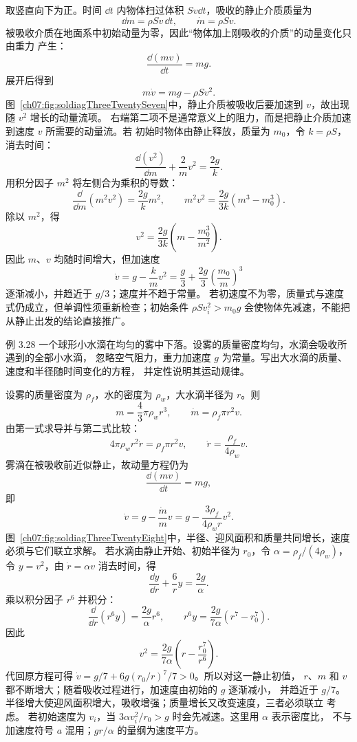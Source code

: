 \begin{xesolution}
取竖直向下为正。时间 $\dd t$ 内物体扫过体积 $Sv\dd t$，吸收的静止介质质量为
\[
 \dd m=\rho Sv\,\dd t,
 \qquad
 \boxed{\dot m=\rho Sv}.
\]
被吸收介质在地面系中初始动量为零，因此“物体加上刚吸收的介质”的动量变化只由重力
产生：
\[
 \frac{\dd(mv)}{\dd t}=mg.
\]
展开后得到
\[
 \boxed{m\dot v=mg-\rho Sv^2}.
\]
图~\ref{ch07:fig:soldiagThreeTwentySeven}中，静止介质被吸收后要加速到 $v$，故出现随 $v^2$ 增长的动量流项。
\soldiagThreeTwentySeven
右端第二项不是通常意义上的阻力，而是把静止介质加速到速度 $v$ 所需要的动量流。若
初始时物体由静止释放，质量为 $m_0$，令 $k=\rho S$，消去时间：
\[
 \frac{\dd(v^2)}{\dd m}+\frac{2}{m}v^2=\frac{2g}{k}.
\]
用积分因子 $m^2$ 将左侧合为乘积的导数：
\[
 \frac{\dd}{\dd m}(m^2v^2)=\frac{2g}{k}m^2,
 \qquad m^2v^2=\frac{2g}{3k}(m^3-m_0^3).
\]
除以 $m^2$，得
\[
 v^2=\frac{2g}{3k}
 \left(m-\frac{m_0^3}{m^2}\right).
\]
因此 $m$、$v$ 均随时间增大，但加速度
\[
 \dot v=g-\frac{k}{m}v^2=\frac g3+\frac{2g}{3}\left(\frac{m_0}{m}\right)^3
\]
逐渐减小，并趋近于 $g/3$；速度并不趋于常量。
若初速度不为零，质量式与速度式仍成立，但单调性须重新检查；初始条件
$\rho S v_i^2>m_0g$ 会使物体先减速，不能把从静止出发的结论直接推广。
\end{xesolution}

\Needspace{0.30\textheight}
\begin{origexamplebox}{例 3.28}
一个球形小水滴在均匀的雾中下落。设雾的质量密度均匀，水滴会吸收所遇到的全部小水滴，
忽略空气阻力，重力加速度 $g$ 为常量。写出大水滴的质量、速度和半径随时间变化的方程，
并定性说明其运动规律。
\end{origexamplebox}

\begin{xesolution}
设雾的质量密度为 $\rho_f$，水的密度为 $\rho_w$，大水滴半径为 $r$。则
\[
 m=\frac43\pi\rho_w r^3,
 \qquad
 \dot m=\rho_f\pi r^2v.
\]
由第一式求导并与第二式比较：
\[
 4\pi\rho_w r^2\dot r=\rho_f\pi r^2v,
 \qquad
 \boxed{\dot r=\frac{\rho_f}{4\rho_w}v}.
\]
雾滴在被吸收前近似静止，故动量方程仍为
\[
 \frac{\dd(mv)}{\dd t}=mg,
\]
即
\[
 \boxed{\dot v
 =g-\frac{\dot m}{m}v
 =g-\frac{3\rho_f}{4\rho_w r}v^2}.
\]
图~\ref{ch07:fig:soldiagThreeTwentyEight}中，半径、迎风面积和质量共同增长，速度必须与它们联立求解。
\soldiagThreeTwentyEight
若水滴由静止开始、初始半径为 $r_0$，令
$\alpha=\rho_f/(4\rho_w)$，令 $y=v^2$，由 $\dot r=\alpha v$ 消去时间，得
\[
 \frac{\dd y}{\dd r}+\frac{6}{r}y=\frac{2g}{\alpha}.
\]
乘以积分因子 $r^6$ 并积分：
\[
 \frac{\dd}{\dd r}(r^6y)=\frac{2g}{\alpha}r^6,
 \qquad r^6y=\frac{2g}{7\alpha}(r^7-r_0^7).
\]
因此
\[
 v^2=\frac{2g}{7\alpha}
 \left(r-\frac{r_0^7}{r^6}\right).
\]
代回原方程可得 $\dot v=g/7+6g(r_0/r)^7/7>0$。所以对这一静止初值，
$r$、$m$ 和 $v$ 都不断增大；随着吸收过程进行，加速度由初始的 $g$ 逐渐减小，
并趋近于 $g/7$。半径增大使迎风面积增大，吸收增强；质量增长又改变速度，三者必须联立
考虑。
若初始速度为 $v_i$，当 $3\alpha v_i^2/r_0>g$ 时会先减速。这里用 $\alpha$ 表示密度比，
不与加速度符号 $a$ 混用；$gr/\alpha$ 的量纲为速度平方。
\end{xesolution}

